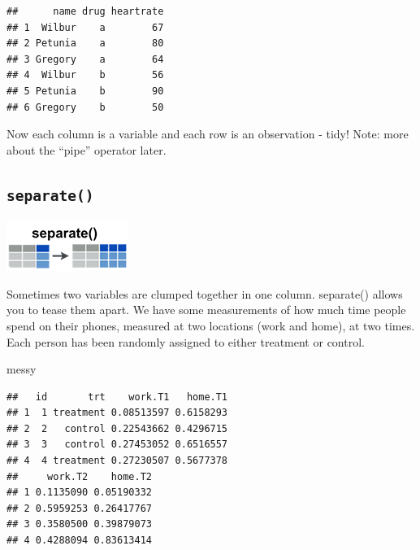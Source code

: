 \documentclass[]{book}
\newenvironment{Shaded}{\begin{snugshade}}{\end{snugshade}}
\newcommand{\KeywordTok}[1]{\textcolor[rgb]{0.13,0.29,0.53}{\textbf{#1}}}
\newcommand{\NormalTok}[1]{#1}
\newcommand{\OperatorTok}[1]{\textcolor[rgb]{0.81,0.36,0.00}{\textbf{#1}}}
\newcommand{\StringTok}[1]{\textcolor[rgb]{0.31,0.60,0.02}{#1}}
\begin{document}
\begin{Shaded}
\end{Shaded}

\begin{verbatim}
##      name drug heartrate
## 1  Wilbur    a        67
## 2 Petunia    a        80
## 3 Gregory    a        64
## 4  Wilbur    b        56
## 5 Petunia    b        90
## 6 Gregory    b        50
\end{verbatim}

Now each column is a variable and each row is an observation - tidy! Note: more about the ``pipe'' operator later.

\hypertarget{separate}{%
\subsection*{\texorpdfstring{\texttt{separate()}}{separate()}}\label{separate}}

\includegraphics{./figures/tidyr-separate.png}

Sometimes two variables are clumped together in one column. separate() allows you to tease them apart. We have some measurements of how much time people spend on their phones, measured at two locations (work and home), at two times. Each person has been randomly assigned to either treatment or control.

\begin{Shaded}
\begin{Highlighting}[]
\NormalTok{messy}
\end{Highlighting}
\end{Shaded}

\begin{verbatim}
##   id       trt    work.T1   home.T1
## 1  1 treatment 0.08513597 0.6158293
## 2  2   control 0.22543662 0.4296715
## 3  3   control 0.27453052 0.6516557
## 4  4 treatment 0.27230507 0.5677378
##     work.T2    home.T2
## 1 0.1135090 0.05190332
## 2 0.5959253 0.26417767
## 3 0.3580500 0.39879073
## 4 0.4288094 0.83613414
\end{verbatim}
\end{document}
